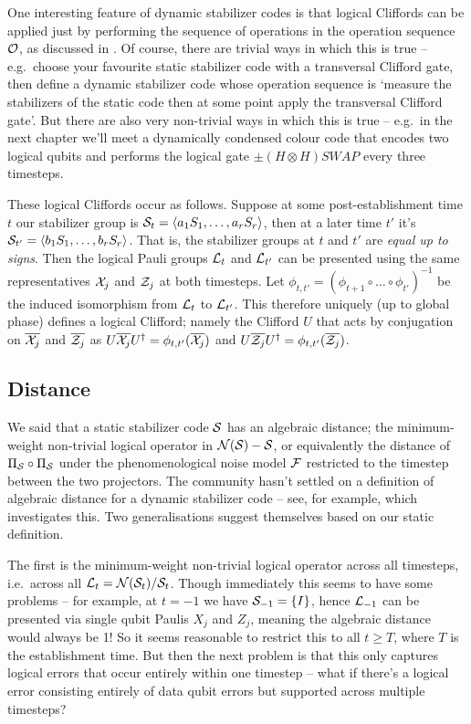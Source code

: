 One interesting feature of dynamic stabilizer codes is that logical Cliffords can be applied just by performing the sequence of operations in the operation sequence $\mathcal{O}$, as discussed in .
Of course, there are trivial ways in which this is true -- e.g.\ choose your favourite static stabilizer code with a transversal Clifford gate, then define a dynamic stabilizer code whose operation sequence is `measure the stabilizers of the static code then at some point apply the transversal Clifford gate'.
But there are also very non-trivial ways in which this is true -- e.g.\ in the next chapter we'll meet a dynamically condensed colour code that encodes two logical qubits and performs the logical gate $\pm (H \otimes H)SWAP$ every three timesteps.

These logical Cliffords occur as follows.
Suppose at some post-establishment time $t$ our stabilizer group is $\mathcal{S}_t = \langle a_1 S_1, \ldots, a_r S_r \rangle$, then at a later time $t'$ it's $\mathcal{S}_{t'} = \langle b_1 S_1, \ldots, b_r S_r \rangle$.
That is, the stabilizer groups at $t$ and $t'$ are \textit{equal up to signs}.
Then the logical Pauli groups $\mathcal{L}_t$ and $\mathcal{L}_{t'}$ can be presented using the same representatives $\mathcal{X}_j$ and $\mathcal{Z}_j$ at both timesteps.
Let $\phi_{t, t'} = (\phi_{t+1} \circ \ldots \circ \phi_{t'})^{-1}$ be the induced isomorphism from $\mathcal{L}_{t}$ to $\mathcal{L}_{t'}$.
This therefore uniquely (up to global phase) defines a logical Clifford; namely the Clifford $U$ that acts by conjugation on $\overline{\mathcal{X}_j}$ and $\overline{\mathcal{Z}_j}$ as $U\overline{\mathcal{X}_j} U^\dagger = \phi_{t,t'}(\overline{\mathcal{X}_j})$ and $U\overline{\mathcal{Z}_j}
U^\dagger = \phi_{t,t'}(\overline{\mathcal{Z}_j})$.

\subsection{Distance}\label{subsec:dynamic_distance}

We said that a static stabilizer code $\mathcal{S}$ has an algebraic distance; the minimum-weight non-trivial logical operator in $\mathcal{N}(\mathcal{S}) - \mathcal{S}$, or equivalently the distance of $\Pi_{\mathcal{S}} \circ \Pi_{\mathcal{S}}$ under the phenomenological noise model $\mathcal{F}$ restricted to the timestep between the two projectors.
The community hasn't settled on a definition of algebraic distance for a dynamic stabilizer code -- see, for example,  which investigates this.
Two generalisations suggest themselves based on our static definition.

The first is the minimum-weight non-trivial logical operator across all timesteps, i.e.\ across all $\mathcal{L}_t = \mathcal{N}(\mathcal{S}_t)/\mathcal{S}_t$.
Though immediately this seems to have some problems -- for example, at $t = -1$ we have $\mathcal{S}_{-1} = \{I\}$, hence $\mathcal{L}_{-1}$ can be presented via single qubit Paulis $X_j$ and $Z_j$, meaning the algebraic distance would always be 1!
So it seems reasonable to restrict this to all $t \geq T$, where $T$ is the establishment time.
But then the next problem is that this only captures logical errors that occur entirely within one timestep -- what if there's a logical error consisting entirely of data qubit errors but supported across multiple timesteps?

